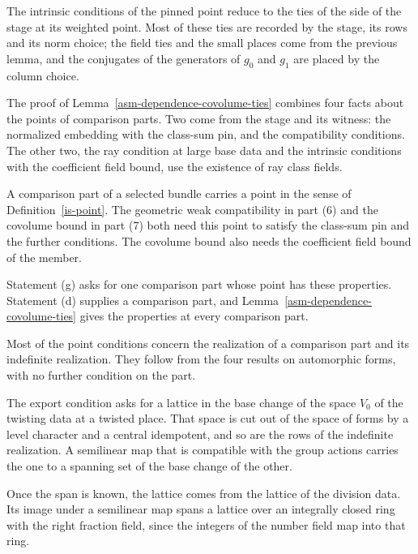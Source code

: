 The intrinsic conditions of the pinned point reduce to the ties of the side of
the stage at its weighted point. Most of these ties are recorded by the stage,
its rows and its norm choice; the field ties and the small places come from the
previous lemma, and the conjugates of the generators of $g_0$ and $g_1$ are
placed by the column choice.

The proof of Lemma~\ref{asm-dependence-covolume-ties} combines four facts about
the points of comparison parts. Two come from the stage and its witness: the
normalized embedding with the class-sum pin, and the compatibility conditions.
The other two, the ray condition at large base data and the intrinsic conditions
with the coefficient field bound, use the existence of ray class fields.

A comparison part of a selected bundle carries a point in the sense of
Definition~\ref{is-point}. The geometric weak compatibility in part (6) and the
covolume bound in part (7) both need this point to satisfy the class-sum pin and
the further conditions. The covolume bound also needs the coefficient field
bound of the member.

Statement (g) asks for one comparison part whose point has these properties.
Statement (d) supplies a comparison part, and
Lemma~\ref{asm-dependence-covolume-ties} gives the properties at every comparison
part.

Most of the point conditions concern the realization of a comparison part and
its indefinite realization. They follow from the four results on automorphic
forms, with no further condition on the part.

The export condition asks for a lattice in the base change of the space $V_0$ of
the twisting data at a twisted place. That space is cut out of the space of forms
by a level character and a central idempotent, and so are the rows of the
indefinite realization. A semilinear map that is compatible with the group
actions carries the one to a spanning set of the base change of the other.

Once the span is known, the lattice comes from the lattice of the division data.
Its image under a semilinear map spans a lattice over an integrally closed ring
with the right fraction field, since the integers of the number field map into
that ring.

